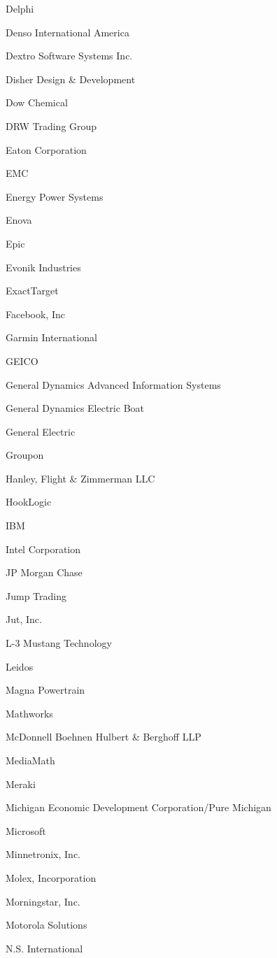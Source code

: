 \documentclass[twoside]{article}
\begin{document}
\begin{center}
\begin{multicols}{5}
\begin{FlushLeft}
\begin{compactitem}
\item Delphi
\item Denso International America
\item Dextro Software Systems Inc.
\item Disher Design \& Development
\item Dow Chemical
\item DRW Trading Group
\item Eaton Corporation
\item EMC
\item Energy Power Systems
\item Enova
\item Epic
\item Evonik Industries
\item ExactTarget
\item Facebook, Inc
\item Garmin International
\item GEICO
\item General Dynamics Advanced Information Systems
\item General Dynamics Electric Boat
\item General Electric
\item Groupon
\item Hanley, Flight \& Zimmerman LLC
\item HookLogic
\item IBM
\item Intel Corporation
\item JP Morgan Chase
\item Jump Trading
\item Jut, Inc.
\item L-3 Mustang Technology
\item Leidos
\item Magna Powertrain
\item Mathworks
\item McDonnell Boehnen Hulbert \& Berghoff LLP
\item MediaMath
\item Meraki
\item Michigan Economic Development Corporation/Pure Michigan
\item Microsoft
\item Minnetronix, Inc.
\item Molex, Incorporation
\item Morningstar, Inc.
\item Motorola Solutions
\item N.S. International

\end{compactitem}
\end{FlushLeft}
\end{multicols}
\end{center}
\end{document}
